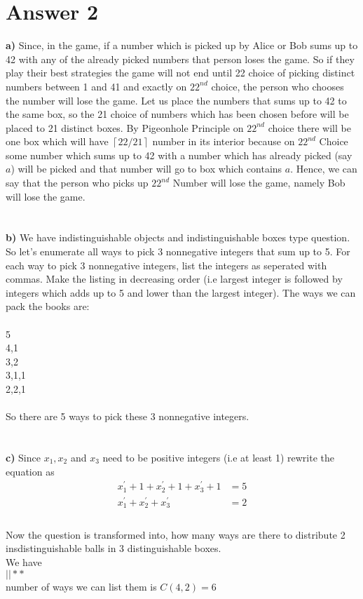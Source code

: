 \documentclass[12pt]{article}
\begin{document}
\section*{Answer 2}
\textbf{a)} Since, in the game, if a number which is picked up by Alice or Bob sums up to 42 with any of the already picked numbers that person loses the game. So if they play their best strategies the game will not end until 22 choice of picking distinct numbers between 1 and 41 and exactly on $22^{nd}$ choice, the person who chooses the number will lose the game. Let us place the numbers that sums up to 42 to the same box, so the 21 choice of numbers which has been chosen before will be placed to 21 distinct boxes. By Pigeonhole Principle on $22^{nd}$ choice there will be one box which will have $\left \lceil{22/21}\right \rceil$ number in its interior because on $22^{nd}$ Choice some number which sums up to 42 with a number which has already picked (say $a$) will be picked and that number will go to box which contains $a$. Hence, we can say that the person who picks up  $22^{nd}$ Number will lose the game, namely Bob will lose the game.\\\\\\
\textbf{b)} 
We have indistinguishable objects and indistinguishable boxes type question. So let's enumerate all ways to pick 3 nonnegative integers that sum up to 5. For each way to pick 3 nonnegative integers, list the integers as seperated with commas. Make the listing in decreasing order (i.e largest integer is followed by integers which adds up to 5 and lower than the largest integer). The ways we can pack the books are:
\\\\
5 \\
4,1 \\
3,2 \\
3,1,1 \\
2,2,1 \\\\
So there are 5 ways to pick these 3 nonnegative integers.\\
\\\\
\textbf{c)} 
Since $ x_1 , x_2$ and $x_3$ need to be positive integers (i.e at least 1) rewrite the equation as \\
\begin{equation*}
\begin{split}
x_1^{'} +1 + x_2^{'} +1 + x_3^{'} +1 &= 5  \\
x_1^{'}  + x_2^{'}  + x_3^{'}	 &=  2 \\
\end{split}	 
\end{equation*} \\
Now the question is transformed into, how many ways are there to distribute 2 insdistinguishable balls in 3 distinguishable boxes.
\\
We have \\
$ | | * * $ \\
number of ways we can list them is $ C(4,2) = 6$
\end{document}
